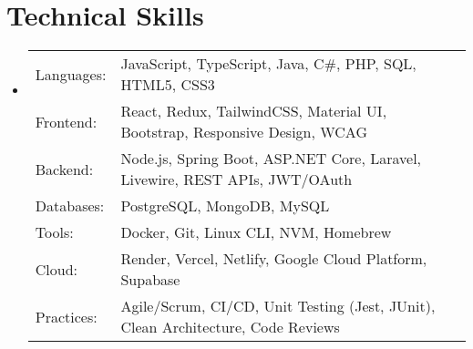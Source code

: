 \documentclass[letterpaper,11pt]{article}
\begin{document}
\section*{Technical Skills}
\begin{itemize}[leftmargin=0.15in, itemsep=2pt]
  \item
    \begin{tabularx}{\textwidth}{@{}l X@{}}
      Languages: & JavaScript, TypeScript, Java, C\#, PHP, SQL, HTML5, CSS3 \\
      Frontend: & React, Redux, TailwindCSS, Material UI, Bootstrap, Responsive Design, WCAG \\
      Backend: & Node.js, Spring Boot, ASP.NET Core, Laravel, Livewire, REST APIs, JWT/OAuth \\
      Databases: & PostgreSQL, MongoDB, MySQL \\
      Tools: & Docker, Git, Linux CLI, NVM, Homebrew \\
      Cloud: & Render, Vercel, Netlify, Google Cloud Platform, Supabase \\
      Practices: & Agile/Scrum, CI/CD, Unit Testing (Jest, JUnit), Clean Architecture, Code Reviews \\
    \end{tabularx}
\end{itemize}
\end{document}
